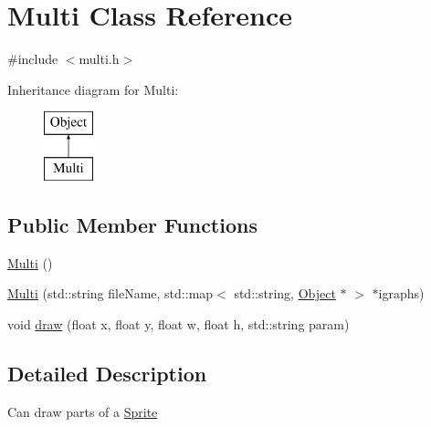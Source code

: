 \hypertarget{class_multi}{\section{Multi Class Reference}
\label{class_multi}
}


{\ttfamily \#include $<$multi.\-h$>$}

Inheritance diagram for Multi\-:\begin{figure}[H]
\begin{center}
\leavevmode
\includegraphics[height=2.000000cm]{class_multi}
\end{center}
\end{figure}
\subsection*{Public Member Functions}
\begin{DoxyCompactItemize}
\item 
\hyperlink{class_multi_a952193613f07eaeb1b75c7835955f169}{Multi} ()
\item 
\hyperlink{class_multi_a7d70368d5229d0ce1b0d735f15fbcd66}{Multi} (std\-::string file\-Name, std\-::map$<$ std\-::string, \hyperlink{class_object}{Object} $\ast$ $>$ $\ast$igraphs)
\item 
void \hyperlink{class_multi_a0b1957cf59a3d44294ddb35dadba199b}{draw} (float x, float y, float w, float h, std\-::string param)
\end{DoxyCompactItemize}


\subsection{Detailed Description}
Can draw parts of a \hyperlink{class_sprite}{Sprite} 

